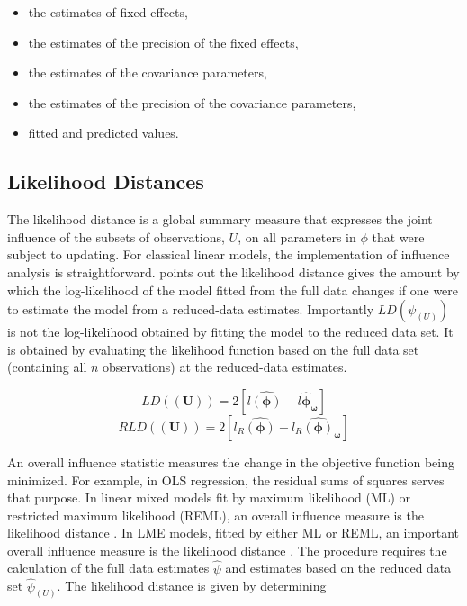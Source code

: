 \documentclass[Main.tex]{subfiles}
\begin{document}
\begin{itemize}
	\item the estimates of fixed effects,
	\item the estimates of the precision of the fixed effects,
	\item the estimates of the covariance parameters,
	\item the estimates of the precision of the covariance parameters,
	\item fitted and predicted values.
\end{itemize}


\newpage
\subsection{Likelihood Distances}

The  likelihood distance is a global summary measure that expresses the joint influence of the subsets of observations, $U$, on all parameters in $\phi$ that were subject to updating. For classical linear models, the implementation of influence analysis is straightforward. \citet{schab} points out the likelihood distance gives the amount by which the log-likelihood of the model fitted from the full data changes if one were
to estimate the model from a reduced-data estimates. Importantly $LD(\psi_{(U)})$ is not the log-likelihood obtained by fitting the model to the reduced data set. It is obtained by evaluating the likelihood function based on the full data set (containing all $n$ observations) at the reduced-data estimates.


\[  LD(\boldsymbol{(U)})= 2[l\boldsymbol{\hat{(\phi)}} - l\boldsymbol{\hat{\phi}_\omega} ] \]
\[  RLD(\boldsymbol{(U)})= 2[ l_R\boldsymbol{\hat{(\phi)}} - l_R\boldsymbol{\hat{(\phi)}_\omega} ] \]


An overall influence statistic measures the change in the objective function being minimized. For example, in
OLS regression, the residual sums of squares serves that purpose. In linear mixed models fit by
 maximum likelihood (ML) or  restricted maximum likelihood (REML), an overall influence measure is the  likelihood distance \citep{cook}. In LME models, fitted by either ML or REML, an important overall
 influence measure is the likelihood distance \citep{cook82}. The  procedure requires the calculation of the full data estimates
 $\hat{\psi}$ and estimates based on the reduced data set  $\hat{\psi}_{(U)}$. The likelihood distance is given by
 determining
 
\end{document}
